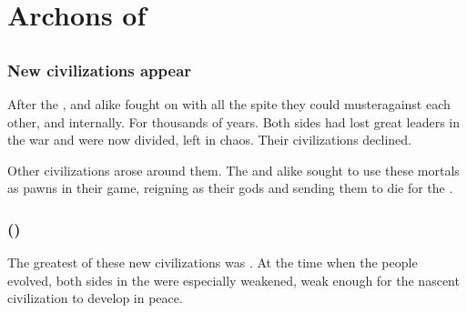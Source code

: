 
\part{Archons of \Miith}























\chapter{\TheLieSublimeBook}
\section{New civilizations appear}
After the \secondbanewar, \resphain{} and \dragons{} alike fought on with all the spite they could muster\dash against each other, and internally. For thousands of years. Both sides had lost great leaders in the war and were now divided, left in chaos. Their civilizations declined. 

Other civilizations arose around them. The \dragons{} and \banes{} alike sought to use these mortals as pawns in their game, reigning as their gods and sending them to die for the \secretwar.









\section{\Cuezca ()}
The greatest of these new civilizations was . 
At the time when the  people evolved, both sides in the \secretwar{} were especially weakened, weak enough for the nascent \Cuezcan{} civilization to develop in peace. 


